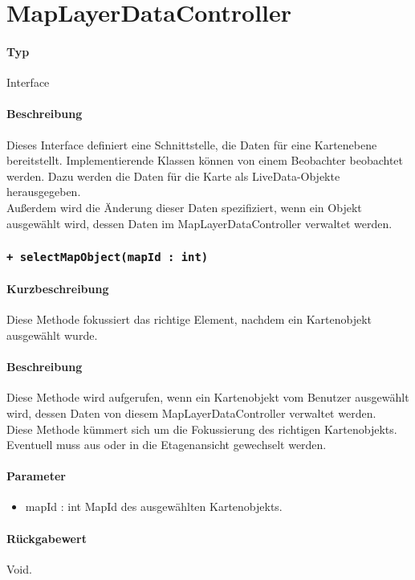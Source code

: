 \section{MapLayerDataController}
\paragraph*{Typ} 
Interface
\paragraph*{Beschreibung}
Dieses Interface definiert eine Schnittstelle, die Daten für eine Kartenebene bereitstellt.
Implementierende Klassen können von einem Beobachter beobachtet werden. Dazu werden die 
Daten für die Karte als LiveData-Objekte herausgegeben.\\
Außerdem wird die Änderung dieser Daten spezifiziert, wenn ein Objekt ausgewählt wird, dessen
Daten im MapLayerDataController verwaltet werden.

\subsubsection{\texttt{+ selectMapObject(mapId : int)}}%
\paragraph*{Kurzbeschreibung}
Diese Methode fokussiert das richtige Element, nachdem ein Kartenobjekt ausgewählt wurde.
\paragraph*{Beschreibung}
Diese Methode wird aufgerufen, wenn ein Kartenobjekt vom Benutzer ausgewählt wird, dessen 
Daten von diesem MapLayerDataController verwaltet werden.\\
Diese Methode kümmert sich um die Fokussierung des richtigen Kartenobjekts. Eventuell muss 
aus oder in die Etagenansicht gewechselt werden.
\paragraph*{Parameter}
\begin{itemize}
    \item mapId : int MapId des ausgewählten Kartenobjekts.
\end{itemize}
\paragraph*{Rückgabewert}
Void.

